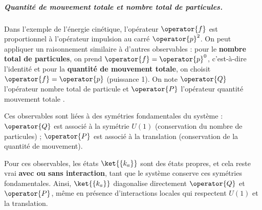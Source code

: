 \subparagraph{Quantité de mouvement totale et nombre total de particules.}
Dans l'exemple de l'énergie cinétique, l'opérateur  $\operator{f}$ est proportionnel à l'opérateur impulsion au carré $\operator{p}^2$. On peut appliquer un raisonnement similaire à d'autres observables : pour le {\bf nombre total de particules}, on prend  $\operator{f} = \operator{p}^0$, c’est-à-dire l’identité et pour la {\bf quantité de mouvement totale}, on choisit $\operator{f} = \operator{p}$ (puissance 1). On note $\operator{Q}$ l'opérateur nombre total de particule et $\operator{P}$ l'opérateur quantité mouvement totale . 

\medskip

Ces observables sont liées à des symétries fondamentales du système : $\operator{Q}$ est associé à la symétrie $U(1)$ (conservation du nombre de particules) ; $\operator{P}$ est associé à la translation (conservation de la quantité de mouvement).

Pour ces observables, les états $\ket{\{k_a\}}$ sont des états propres, et cela reste vrai \textbf{avec ou sans interaction}, tant que le système conserve ces symétries fondamentales. Ainsi, $\ket{\{k_a\}}$ diagonalise directement $\operator{Q}$ et $\operator{P}$, même en présence d’interactions locales qui respectent $U(1)$ et la translation.

\medskip


